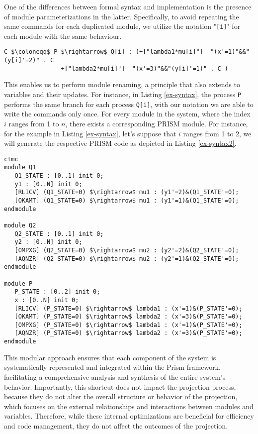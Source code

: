 One of the differences between formal syntax and implementation is the presence of module parameterizations in the latter. Specifically, to avoid repeating the same commands for each duplicated module, we utilize the notation "\texttt{[i]}" for each module with the same behaviour.   
\begin{lstlisting}[style=chor-color,breaklines=true, postbreak=\mbox{\textcolor{red}{$\hookrightarrow$}\space},caption={Example of an use of parameterization in the choreographic language},captionpos=b,label={ex-syntax}]
	C $\coloneqq$ P $\rightarrow$ Q[i] : (+["lambda1*mu[i]"]  "(x'=1)"&&"(y[i]'=2)" . C
			    +["lambda2*mu[i]"]  "(x'=3)"&&"(y[i]'=1)" . C )
\end{lstlisting}
This enables us to perform module renaming, a principle that also extends to variables and their updates. For instance, in Listing \ref{ex-syntax}, the process \texttt{P} performs the same branch for each process \texttt{Q[i]}, with our notation we are able to write the commands only once. 
For every module in the system, where the index 
$i$ ranges from 1 to $n$, there exists a corresponding PRISM module. For instance, for the example in Listing \ref{ex-syntax}, let's suppose that $i$ ranges  from 1 to 2, we will generate the respective PRISM code as depicted in Listing \ref{ex-syntax2}. 
\begin{lstlisting}[style=prism-color,caption={PRISM code generated for the choreography in Listing \ref{ex-syntax}},captionpos=b,label={ex-syntax2}]
ctmc
module Q1
   Q1_STATE : [0..1] init 0;
   y1 : [0..N] init 0;
   [RLICV] (Q1_STATE=0) $\rightarrow$ mu1 : (y1'=2)&(Q1_STATE'=0);
   [OKAMT] (Q1_STATE=0) $\rightarrow$ mu1 : (y1'=1)&(Q1_STATE'=0);
endmodule

module Q2
   Q2_STATE : [0..1] init 0;
   y2 : [0..N] init 0;
   [OMPXG] (Q2_STATE=0) $\rightarrow$ mu2 : (y2'=2)&(Q2_STATE'=0);
   [AQNZR] (Q2_STATE=0) $\rightarrow$ mu2 : (y2'=1)&(Q2_STATE'=0);
endmodule

module P
   P_STATE : [0..2] init 0;
   x : [0..N] init 0;
   [RLICV] (P_STATE=0) $\rightarrow$ lambda1 : (x'=1)&(P_STATE'=0);
   [OKAMT] (P_STATE=0) $\rightarrow$ lambda2 : (x'=3)&(P_STATE'=0);
   [OMPXG] (P_STATE=0) $\rightarrow$ lambda1 : (x'=1)&(P_STATE'=0);
   [AQNZR] (P_STATE=0) $\rightarrow$ lambda2 : (x'=3)&(P_STATE'=0);
endmodule
\end{lstlisting}
This modular approach ensures that each component of the system is systematically represented and integrated within the Prism framework, facilitating a comprehensive analysis and synthesis of the entire system's behavior.
Importantly, this shortcut does not impact the projection process, because they do not alter the overall structure or behavior of the projection, which focuses on the external relationships and interactions between modules and variables. Therefore, while these internal optimizations are beneficial for efficiency and code management, they do not affect the outcomes of the projection.

